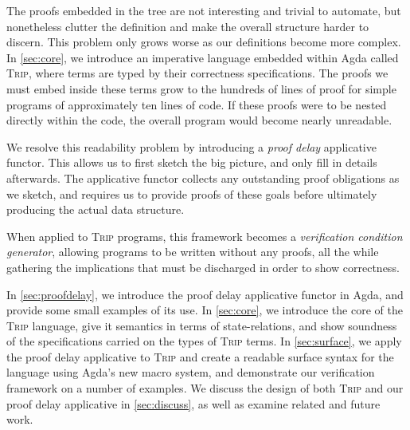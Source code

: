 \documentclass[sigplan,review]{acmart}\settopmatter{printfolios=true,printccs=false,printacmref=false}
\begin{document}
The proofs embedded in the tree are not interesting and trivial to automate, but nonetheless
clutter the definition and make the overall structure harder to 
discern. This problem only grows worse as our definitions become more complex.
In \autoref{sec:core}, we introduce an imperative language embedded within Agda called \textsc{Trip},
where terms are typed by their correctness specifications. The proofs we must embed inside these 
terms grow to the hundreds of lines of proof for simple programs of approximately ten lines
of code. If these proofs were to be nested directly within the code, the 
overall program would become nearly unreadable.

We resolve this readability problem by introducing a \emph{proof delay}
applicative functor. This allows us to first sketch the big picture, 
and only fill in details afterwards. The applicative functor
collects any outstanding proof obligations as we sketch, and requires us 
to provide proofs of these goals before ultimately producing the actual data structure.


When applied to \textsc{Trip} programs, this framework becomes a 
\emph{verification condition generator}, allowing programs to be written 
without any proofs, all the while gathering the implications that must be discharged
in order to show correctness. 

In \autoref{sec:proofdelay}, we introduce the proof delay applicative functor in Agda, and provide 
some small examples of its use. In \autoref{sec:core}, we introduce the core of the \textsc{Trip}
language, give it semantics in terms of state-relations, and show soundness of the specifications
carried on the types of \textsc{Trip} terms. In \autoref{sec:surface}, we apply the proof delay 
applicative to \textsc{Trip} and create a readable surface syntax for the language using 
Agda's new macro system, and demonstrate our verification framework on a
number of examples. We discuss the design of both \textsc{Trip} and our proof delay 
applicative in \autoref{sec:discuss}, as well as examine related and future work. 
\end{document}
